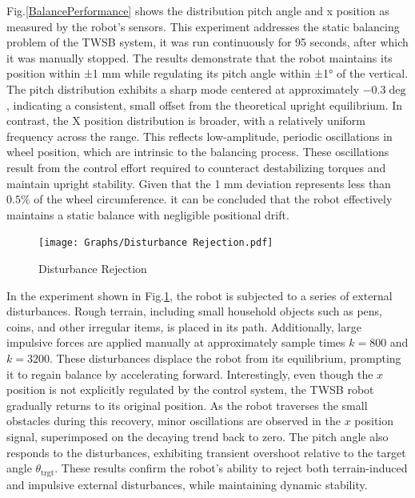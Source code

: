     Fig.\ref{BalancePerformance} shows the 
    distribution pitch angle and x position as measured by the robot's sensors. 
    This experiment addresses the static balancing problem of the TWSB system, it was run continuously for 95 seconds,
    after which it was manually stopped. The results demonstrate that the robot maintains its position within ±1 mm 
    while regulating its pitch angle within ±1° of the vertical. The pitch distribution exhibits a sharp mode centered
    at approximately $-0.3\deg$, indicating a consistent, small offset from the theoretical upright equilibrium. 
    In contrast, the X position distribution is broader, with a relatively uniform frequency across the range. 
    This reflects low-amplitude, periodic oscillations in wheel position, which are intrinsic to the balancing process. 
    These oscillations result from the control effort required to counteract destabilizing torques and maintain upright stability. 
    Given that the 1 mm deviation represents less than $0.5\%$ of the wheel circumference.
    it can be concluded that the robot effectively maintains a static balance with negligible positional drift.
    \begin{figure}[H]
        \centering
        \texttt{[image: Graphs/Disturbance Rejection.pdf]}
        \caption{Disturbance Rejection}
        \label{fig:DisturbanceRejection}
    \end{figure}

    In the experiment shown in Fig.\ref{fig:DisturbanceRejection}, the robot is subjected to a series of external disturbances. 
    Rough terrain, including small household objects such as pens, coins, and other irregular items, is placed in its path. 
    Additionally, large impulsive forces are applied manually at approximately sample times $k = 800$ and $k = 3200$. 
    These disturbances displace the robot from its equilibrium, prompting it to regain balance by accelerating forward.
    Interestingly, even though the $x$ position is not explicitly regulated by the control system, 
    the TWSB robot gradually returns to its original position. As the robot traverses the small obstacles during this recovery, 
    minor oscillations are observed in the $x$ position signal, superimposed on the decaying trend back to zero.
    The pitch angle also responds to the disturbances, exhibiting transient overshoot relative to the 
    target angle  $\theta_{\text{trgt}}$. These results confirm the robot's ability to reject both terrain-induced 
    and impulsive external disturbances, while maintaining dynamic stability.

